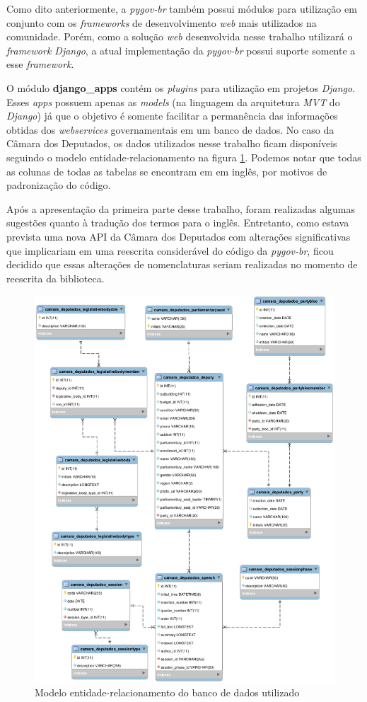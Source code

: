 Como dito anteriormente, a \textit{pygov-br} também possui módulos para utilização em conjunto com os \textit{frameworks} de desenvolvimento \textit{web} mais utilizados na comunidade. Porém, como a solução \textit{web} desenvolvida nesse trabalho utilizará o \textit{framework Django}, a atual implementação da \textit{pygov-br} possui suporte somente a esse \textit{framework}.

O módulo \textbf{django\_apps} contém os \textit{plugins} para utilização em projetos \textit{Django}. Esses \textit{apps} possuem apenas as \textit{models} (na linguagem da arquitetura \textit{MVT} do \textit{Django}) já que o objetivo é somente facilitar a permanência das informações obtidas dos \textit{webservices} governamentais em um banco de dados. No caso da Câmara dos Deputados, os dados utilizados nesse trabalho ficam disponíveis seguindo o modelo entidade-relacionamento na figura \ref{modelo-eer}. Podemos notar que todas as colunas de todas as tabelas se encontram em em inglês, por motivos de padronização do código.

Após a apresentação da primeira parte desse trabalho, foram realizadas algumas sugestões quanto à tradução dos termos para o inglês. Entretanto, como estava prevista uma nova API da Câmara dos Deputados com alterações significativas que implicariam em uma reescrita considerável do código da \textit{pygov-br}, ficou decidido que essas alterações de nomenclaturas seriam realizadas no momento de reescrita da biblioteca.


\begin{figure}[h]
    \centering
    \includegraphics[scale=0.5]{figuras/pygov-eer.eps}
    \caption{Modelo entidade-relacionamento do banco de dados utilizado}
    \label{modelo-eer}
\end{figure}
